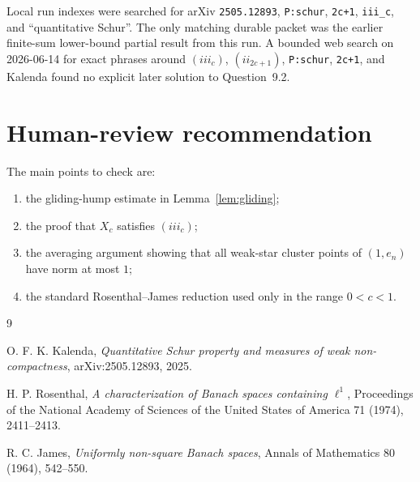 \documentclass[11pt]{article}
\begin{document}
Local run indexes were searched for arXiv \texttt{2505.12893},
\texttt{P:schur}, \texttt{2c+1}, \texttt{iii\_c}, and ``quantitative Schur''.
The only matching durable packet was the earlier finite-sum lower-bound
partial result from this run.  A bounded web search on 2026-06-14 for exact
phrases around \((iii_c)\), \((ii_{2c+1})\), \texttt{P:schur}, \texttt{2c+1},
and Kalenda found no explicit later solution to Question~9.2.

\section*{Human-review recommendation}

The main points to check are:
\begin{enumerate}
\item the gliding-hump estimate in Lemma~\ref{lem:gliding};
\item the proof that \(X_c\) satisfies \((iii_c)\);
\item the averaging argument showing that all weak-star cluster points of
      \((1,e_n)\) have norm at most \(1\);
\item the standard Rosenthal--James reduction used only in the range
      \(0<c<1\).
\end{enumerate}

\begin{thebibliography}{9}

O. F. K. Kalenda,
\emph{Quantitative Schur property and measures of weak non-compactness},
arXiv:2505.12893, 2025.

H. P. Rosenthal,
\emph{A characterization of Banach spaces containing \(\ell^1\)},
Proceedings of the National Academy of Sciences of the United States of
America 71 (1974), 2411--2413.

R. C. James,
\emph{Uniformly non-square Banach spaces},
Annals of Mathematics 80 (1964), 542--550.

\end{thebibliography}
\end{document}
